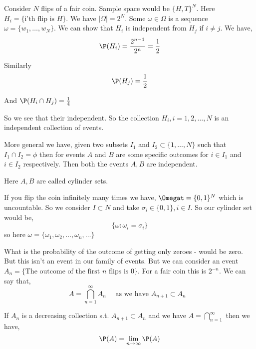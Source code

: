\begin{eg}
Consider $N$ flips of a fair coin. Sample space would be $\{H, T\}^{N}$. Here $H_i = \{\text{i'th flip is $H$}\} $.  We have $|\Omega| = 2^{N}$. Some $\omega \in \Omega$ is a sequence  $\omega = \{w_1, \dots, w_N\}$. We can show that $H_i$ is independent from $H_j$ if  $i \ne j$. We have,  
$$ \P(H_i) = \frac{2^{n - 1}}{2^{n}} = \frac{1}{2} $$ 

Similarly $$\P(H_j) = \frac{1}{2}$$

And $\P(H_i \cap H_j) = \frac{1}{4}$ 

So we see that their independent. So the collection $H_i, i = 1,2,\dots,N$ is an independent collection of events.
\end{eg}

\begin{remark}
    More general we have,  given two subsets  $I_1$ and $I_2 \subset \{1, \dots, N\} $ such that $I_1 \cap I_2  = \phi$ then for events $A$ and $B$ are some specific outcomes for $ i \in I_1$ and $i \in I_2$ respectively. Then both the events  $A,B$ are independent.

    Here $A, B$ are called cylinder sets.
\end{remark}

\begin{eg}
    If you flip the coin infinitely many times we have, $\Omegat = \{0, 1\}^{N}$ which is uncountable. So we consider $I \subset N$ and take  $\sigma_i \in \{0, 1\} , i \in I$.  So our cylinder set would be,  
    $$ \{\omega: \omega_i = \sigma_i\}  $$  so here $\omega = \{\omega_1, \omega_2, \dots, \omega_n, \dots\} $

\end{eg}



\begin{eg}

    What is the probability of the outcome of getting only zeroes - would be zero. But this isn't an event in our family of events. But we can consider an event $A_n  =\{\text{The outcome of the first $n$ flips is 0}\} $. For a fair coin this is $2^{-n}$. We can say that, 
    $$ A = \bigcap_{n = 1}^{\infty} A_n \quad \text{ as we have $A_{n + 1} \subset A_n$ }$$  
\end{eg}

\begin{theorem}
If $A_n$ is a decreasing collection s.t. $A_{n + 1} \subset A_n$ and we have  $A = \bigcap_{n = 1}^{\infty}$ then we have, 
    $$ \P(A) = \lim_{n \to \infty} \P(A) $$ 
\end{theorem}



